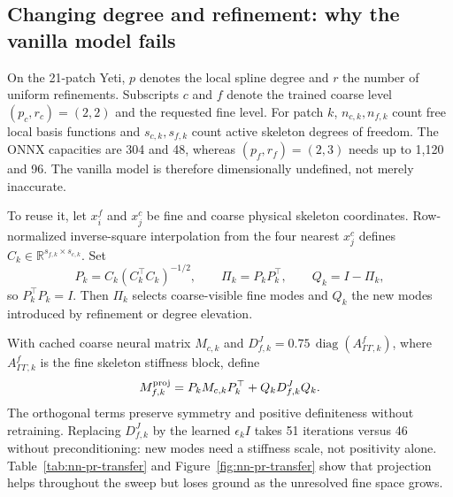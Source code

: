 \documentclass{article}
\newcommand{\R}{\mathbb{R}}
\theoremstyle{plain}
\numberwithin{equation}{section}
\begin{document}
\subsection{Changing degree and refinement: why the vanilla model fails}
\label{subsec:nn-pr-transfer}

On the 21-patch Yeti, $p$ denotes the local spline degree and $r$ the number
of uniform refinements.  Subscripts $c$ and $f$ denote the trained coarse
level $(p_c,r_c)=(2,2)$ and the requested fine level.  For patch $k$,
$n_{c,k},n_{f,k}$ count free local basis functions and $s_{c,k},s_{f,k}$ count
active skeleton degrees of freedom.  The ONNX capacities are 304 and 48,
whereas $(p_f,r_f)=(2,3)$ needs up to 1,120 and 96.  The vanilla model is
therefore dimensionally undefined, not merely inaccurate.

To reuse it, let $x_i^f$ and $x_j^c$ be fine and coarse physical skeleton
coordinates.  Row-normalized inverse-square interpolation from the four
nearest $x_j^c$ defines $C_k\in\R^{s_{f,k}\times s_{c,k}}$.  Set
\begin{equation}
    P_k=C_k(C_k^\top C_k)^{-1/2},\qquad
    \Pi_k=P_kP_k^\top,\qquad Q_k=I-\Pi_k,
    \label{eq:nn-projector}
\end{equation}
so $P_k^\top P_k=I$.  Then $\Pi_k$ selects coarse-visible fine modes and $Q_k$
the new modes introduced by refinement or degree elevation.

With cached coarse neural matrix $M_{c,k}$ and
$D^J_{f,k}=0.75\,\operatorname{diag}(A^f_{\Gamma\Gamma,k})$, where
$A^f_{\Gamma\Gamma,k}$ is the fine skeleton stiffness block, define
\begin{equation}
    M^{\rm proj}_{f,k}=P_kM_{c,k}P_k^\top+Q_kD^J_{f,k}Q_k.
    \label{eq:nn-projected-operator}
\end{equation}
The orthogonal terms preserve symmetry and positive definiteness without
retraining.  Replacing $D^J_{f,k}$ by the learned $\epsilon_k I$ takes 51
iterations versus 46 without preconditioning: new modes need a stiffness
scale, not positivity alone.  Table~\ref{tab:nn-pr-transfer} and
Figure~\ref{fig:nn-pr-transfer} show that projection helps throughout the
sweep but loses ground as the unresolved fine space grows.
\end{document}
